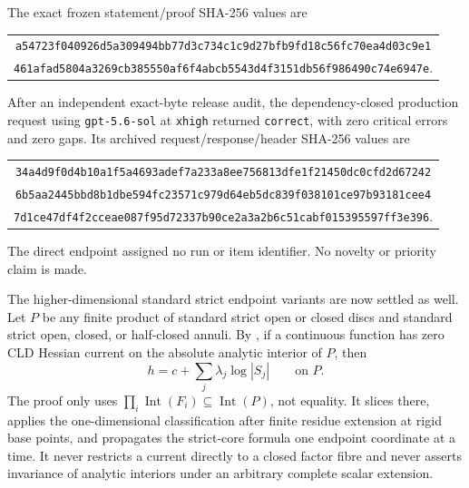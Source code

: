 The exact frozen statement/proof SHA-256 values are
\begin{center}
\small
\begin{tabular}{@{}c@{}}
\nolinkurl{a54723f040926d5a309494bb77d3c734c1c9d27bfb9fd18c56fc70ea4d03c9e1}\\
\nolinkurl{461afad5804a3269cb385550af6f4abcb5543d4f3151db56f986490c74e6947e}.
\end{tabular}
\end{center}
After an independent exact-byte release audit, the dependency-closed
production request using \texttt{gpt-5.6-sol} at \texttt{xhigh} returned
\texttt{correct}, with zero critical errors and zero gaps.  Its archived
request/response/header SHA-256 values are
\begin{center}
\small
\begin{tabular}{@{}c@{}}
\nolinkurl{34a4d9f0d4b10a1f5a4693adef7a233a8ee756813dfe1f21450dc0cfd2d67242}\\
\nolinkurl{6b5aa2445bbd8b1dbe594fc23571c979d64eb5dc839f038101ce97b93181cee4}\\
\nolinkurl{7d1ce47df4f2cceae087f95d72337b90ce2a3a2b6c51cabf015395597ff3e396}.
\end{tabular}
\end{center}
The direct endpoint assigned no run or item identifier.  No novelty or
priority claim is made.

The higher-dimensional standard strict endpoint variants are now settled as
well.  Let \(P\) be any finite product of standard strict open or closed
discs and standard strict open, closed, or half-closed annuli.  By
, if a continuous function
has zero CLD Hessian current on the absolute analytic interior of \(P\), then
\[
                         h=c+\sum_j\lambda_j\log|S_j|
                         \qquad\text{on }P.
\]
The proof only uses
\(
 \prod_i\operatorname{Int}(F_i)\subseteq\operatorname{Int}(P)
\), not equality.  It slices there, applies the one-dimensional
classification after finite residue extension at rigid base points, and
propagates the strict-core formula one endpoint coordinate at a time.  It
never restricts a current directly to a closed factor fibre and never
asserts invariance of analytic interiors under an arbitrary complete scalar
extension.

